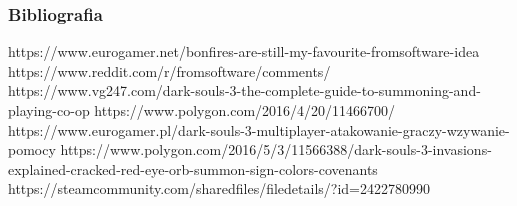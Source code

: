 \documentclass{beamer}
\begin{document}
\begin{frame}
		\frametitle{Bibliografia}
			\begin{thebibliography}{99}
			https://www.eurogamer.net/bonfires-are-still-my-favourite-fromsoftware-idea
			https://www.reddit.com/r/fromsoftware/comments/
			https://www.vg247.com/dark-souls-3-the-complete-guide-to-summoning-and-playing-co-op
			 https://www.polygon.com/2016/4/20/11466700/
			https://www.eurogamer.pl/dark-souls-3-multiplayer-atakowanie-graczy-wzywanie-pomocy 
			https://www.polygon.com/2016/5/3/11566388/dark-souls-3-invasions-explained-cracked-red-eye-orb-summon-sign-colors-covenants 
			https://steamcommunity.com/sharedfiles/filedetails/?id=2422780990 
		\end{thebibliography}
	\end{frame}
\end{document}
